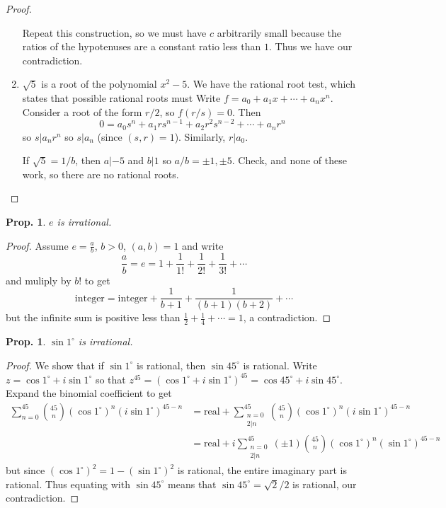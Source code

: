 \documentclass[12pt, a4paper]{book}
\newtheorem{proposition}[theorem]{Prop.}
\theoremstyle{nonumberplain}
\newtheorem{proof}{Proof}
\begin{document}
\begin{proof}
\begin{enumerate}
            Repeat this construction, so we must have $c$ arbitrarily small because the ratios of the hypotenuses are a constant ratio less than $1$.
            Thus we have our contradiction.
        \item $\sqrt{5}$ is a root of the polynomial $x^2-5$.
            We have the rational root test, which states that possible rational roots must 
            Write $f=a_0+a_1x+\cdots+a_nx^n$.
            Consider a root of the form $r/2$, so $f(r/s)=0$. Then
            \[0=a_0s^n+a_1rs^{n-1}+a_2r^2s^{n-2}+\cdots+a_nr^n\]
            so $s|a_nr^n$ so $s|a_n$ (since $(s,r)=1$).
            Similarly, $r|a_0$.

            If $\sqrt{5}=1/b$, then $a|-5$ and $b|1$ so $a/b=\pm 1,\pm 5$.
            Check, and none of these work, so there are no rational roots.
    \end{enumerate}
\end{proof}
\begin{proposition}
    $e$ is irrational.
\end{proposition}
\begin{proof}
    Assume $e=\frac{a}{b}$, $b>0$, $(a,b)=1$  and write
    \[\frac{a}{b}=e=1+\frac{1}{1!}+\frac{1}{2!}+\frac{1}{3!}+\cdots\]
    and muliply by $b!$ to get
    \[\text{integer}=\text{integer}+\frac{1}{b+1}+\frac{1}{(b+1)(b+2)}+\cdots \]
    but the infinite sum is positive less than $\frac{1}{2}+\frac{1}{4}+\cdots=1$, a contradiction.
\end{proof}
\begin{proposition}
    $\sin 1^\circ$ is irrational.
\end{proposition}
\begin{proof}
    We show that if $\sin 1^\circ$ is rational, then $\sin 45^\circ$ is rational.
    Write $z=\cos 1^\circ+i\sin 1^\circ$ so that $z^{45}=(\cos 1^\circ+i\sin 1^\circ)^{45}=\cos 45^\circ+i\sin 45^\circ$.
    Expand the binomial coefficient to get
    \begin{align*}
        \sum\limits_{n=0}^{45}\binom{45}{n}(\cos 1^\circ)^n(i\sin 1^\circ)^{45-n} &= \text{real}+\sum\limits_{\substack{n=0\\2|n}}^{45}\binom{45}{n}(\cos 1^\circ)^n(i\sin 1^\circ)^{45-n}\\
                                                                                  &= \text{real}+i\sum\limits_{\substack{n=0\\2|n}}^{45}(\pm1)\binom{45}{n}(\cos 1^\circ)^n(\sin 1^\circ)^{45-n}
    \end{align*}
    but since $(\cos 1^\circ)^2=1-(\sin 1^\circ)^2$ is rational, the entire imaginary part is rational.
    Thus equating with $\sin 45^\circ$ means that $\sin 45^\circ=\sqrt{2}/2$ is rational, our contradiction.
\end{proof}
\end{document}
